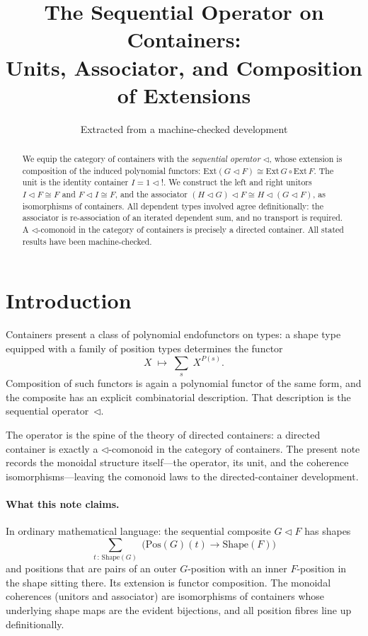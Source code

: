\documentclass[11pt,a4paper]{article}
\title{The Sequential Operator on Containers:\\
  Units, Associator, and Composition of Extensions}
\author{Extracted from a machine-checked development}
\date{}
\theoremstyle{plain}
\theoremstyle{definition}
\newcommand{\Ext}{\mathrm{Ext}}
\newcommand{\Shape}{\mathrm{Shape}}
\newcommand{\Pos}{\mathrm{Pos}}
\newcommand{\seqop}{\mathbin{\triangleleft}}
\begin{document}
\maketitle

\begin{abstract}
We equip the category of containers with the \emph{sequential operator}
$\seqop$, whose extension is composition of the induced polynomial
functors: $\Ext(G \seqop F) \cong \Ext\,G \circ \Ext\,F$. The unit is the
identity container $I = 1 \seqop {!}$. We construct the left and right
unitors $I \seqop F \cong F$ and $F \seqop I \cong F$, and the
associator $(H \seqop G) \seqop F \cong H \seqop (G \seqop F)$, as
isomorphisms of containers. All dependent types involved agree
definitionally: the associator is re-association of an iterated
dependent sum, and no transport is required. A $\seqop$-comonoid in the
category of containers is precisely a directed container. All stated
results have been machine-checked.
\end{abstract}

\tableofcontents
\bigskip

\section{Introduction}

Containers present a class of polynomial endofunctors on types: a shape
type equipped with a family of position types determines the functor
\[
  X \;\longmapsto\; \sum_{s}\; X^{P(s)}.
\]
Composition of such functors is again a polynomial functor of the same
form, and the composite has an explicit combinatorial description. That
description is the sequential operator~$\seqop$.

The operator is the spine of the theory of directed containers: a
directed container is exactly a $\seqop$-comonoid in the category of
containers. The present note records the monoidal structure itself---the
operator, its unit, and the coherence isomorphisms---leaving the
comonoid laws to the directed-container development.

\paragraph{What this note claims.}
In ordinary mathematical language: the sequential composite
$G \seqop F$ has shapes
\[
  \sum_{t \,:\, \Shape(G)}\;
  \bigl(\Pos(G)(t) \to \Shape(F)\bigr)
\]
and positions that are pairs of an outer $G$-position with an inner
$F$-position in the shape sitting there. Its extension is functor
composition. The monoidal coherences (unitors and associator) are
isomorphisms of containers whose underlying shape maps are the evident
bijections, and all position fibres line up definitionally.
\end{document}
